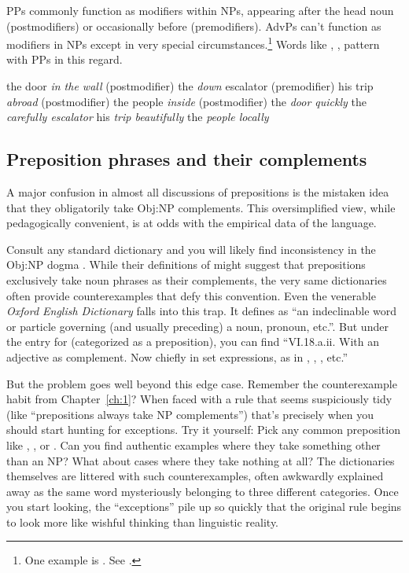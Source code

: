 PPs commonly function as modifiers within NPs, appearing after the head noun (postmodifiers) or occasionally before (premodifiers). AdvPs can't function as modifiers in NPs except in very special circumstances.\footnote{One example is . See \textcite[]{payne2010}.} Words like , ,  pattern with PPs in this regard.

\ea\label{ex:pp-np-mod} %
   \ea the door \emph{in the wall} (postmodifier)
   \ex the \emph{down} escalator (premodifier)
   \ex his trip \emph{abroad} (postmodifier)
   \ex the people \emph{inside} (postmodifier)
   \z
\z
\ea\label{ex:advp-np-mod} %
   \ea *the \emph{door quickly}
   \ex *the \emph{carefully escalator}
   \ex *his \emph{trip beautifully}
   \ex *the \emph{people locally}
   \z
\z{}

\subsection{Preposition phrases and their complements}

A major confusion in almost all discussions of prepositions is the mistaken idea that they obligatorily take Obj:NP complements. This oversimplified view, while pedagogically convenient, is at odds with the empirical data of the language.

Consult any standard dictionary and you will likely find inconsistency in the Obj:NP dogma \autocite{reynolds2025}. While their definitions of  might suggest that prepositions exclusively take noun phrases as their complements, the very same dictionaries often provide counterexamples that defy this convention. Even the venerable \textit{Oxford English Dictionary} falls into this trap. It defines  as \enquote{an indeclinable word or particle governing (and usually preceding) a noun, pronoun, etc.}. But under the entry for  (categorized as a preposition), you can find \enquote{VI.18.a.ii. With an adjective as complement. Now chiefly in set expressions, as in , , , etc.}

But the problem goes well beyond this edge case. Remember the counterexample habit from Chapter~\ref{ch:1}? When faced with a rule that seems suspiciously tidy (like \enquote{prepositions always take NP complements}) that's precisely when you should start hunting for exceptions. Try it yourself: Pick any common preposition like , , or . Can you find authentic examples where they take something other than an NP? What about cases where they take nothing at all? The dictionaries themselves are littered with such counterexamples, often awkwardly explained away as the same word mysteriously belonging to three different categories. Once you start looking, the \enquote{exceptions} pile up so quickly that the original rule begins to look more like wishful thinking than linguistic reality.

